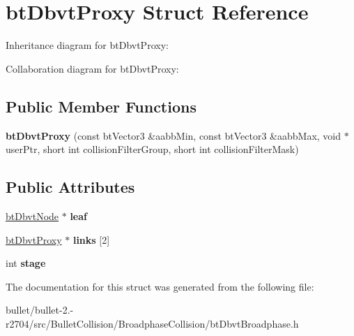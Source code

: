 \hypertarget{structbt_dbvt_proxy}{\section{bt\+Dbvt\+Proxy Struct Reference}
\label{structbt_dbvt_proxy}
}


Inheritance diagram for bt\+Dbvt\+Proxy\+:


Collaboration diagram for bt\+Dbvt\+Proxy\+:
\subsection*{Public Member Functions}
\begin{DoxyCompactItemize}
\item 
\hypertarget{structbt_dbvt_proxy_a5b732547db62d49cd410578ba8efbbd4}{{\bfseries bt\+Dbvt\+Proxy} (const bt\+Vector3 \&aabb\+Min, const bt\+Vector3 \&aabb\+Max, void $\ast$user\+Ptr, short int collision\+Filter\+Group, short int collision\+Filter\+Mask)}\label{structbt_dbvt_proxy_a5b732547db62d49cd410578ba8efbbd4}

\end{DoxyCompactItemize}
\subsection*{Public Attributes}
\begin{DoxyCompactItemize}
\item 
\hypertarget{structbt_dbvt_proxy_ad0d2ff89ee5ce13e5d669bb5957faa69}{\hyperlink{structbt_dbvt_node}{bt\+Dbvt\+Node} $\ast$ {\bfseries leaf}}\label{structbt_dbvt_proxy_ad0d2ff89ee5ce13e5d669bb5957faa69}

\item 
\hypertarget{structbt_dbvt_proxy_aa27b9ea29b43f5b6313d6dd3a3b22c19}{\hyperlink{structbt_dbvt_proxy}{bt\+Dbvt\+Proxy} $\ast$ {\bfseries links} \mbox{[}2\mbox{]}}\label{structbt_dbvt_proxy_aa27b9ea29b43f5b6313d6dd3a3b22c19}

\item 
\hypertarget{structbt_dbvt_proxy_a103fd247822f6cc910ef02a9bb7e7b02}{int {\bfseries stage}}\label{structbt_dbvt_proxy_a103fd247822f6cc910ef02a9bb7e7b02}

\end{DoxyCompactItemize}


The documentation for this struct was generated from the following file\+:\begin{DoxyCompactItemize}
\item 
bullet/bullet-\/2.-\/r2704/src/\+Bullet\+Collision/\+Broadphase\+Collision/bt\+Dbvt\+Broadphase.\+h\end{DoxyCompactItemize}
